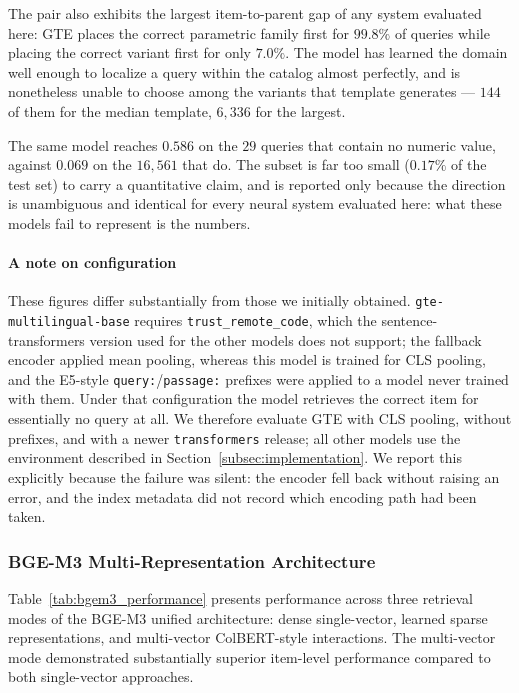 \documentclass[preprint,review,12pt]{elsarticle}
\begin{document}
The pair also exhibits the largest item-to-parent gap of any system evaluated here: GTE places the correct parametric family first for $99.8\%$ of queries while placing the correct variant first for only $7.0\%$. The model has learned the domain well enough to localize a query within the catalog almost perfectly, and is nonetheless unable to choose among the variants that template generates --- $144$ of them for the median template, $6{,}336$ for the largest.

The same model reaches $0.586$ on the $29$ queries that contain no numeric value, against $0.069$ on the $16{,}561$ that do. The subset is far too small ($0.17\%$ of the test set) to carry a quantitative claim, and is reported only because the direction is unambiguous and identical for every neural system evaluated here: what these models fail to represent is the numbers.

\paragraph{A note on configuration} These figures differ substantially from those we initially obtained. \texttt{gte-multilingual-base} requires \texttt{trust\_remote\_code}, which the sentence-transformers version used for the other models does not support; the fallback encoder applied mean pooling, whereas this model is trained for CLS pooling, and the E5-style \texttt{query:}/\texttt{passage:} prefixes were applied to a model never trained with them. Under that configuration the model retrieves the correct item for essentially no query at all. We therefore evaluate GTE with CLS pooling, without prefixes, and with a newer \texttt{transformers} release; all other models use the environment described in Section~\ref{subsec:implementation}. We report this explicitly because the failure was silent: the encoder fell back without raising an error, and the index metadata did not record which encoding path had been taken.


\subsubsection{BGE-M3 Multi-Representation Architecture}

Table~\ref{tab:bgem3_performance} presents performance across three retrieval modes of the BGE-M3 unified architecture: dense single-vector, learned sparse representations, and multi-vector ColBERT-style interactions. The multi-vector mode demonstrated substantially superior item-level performance compared to both single-vector approaches.
\end{document}

